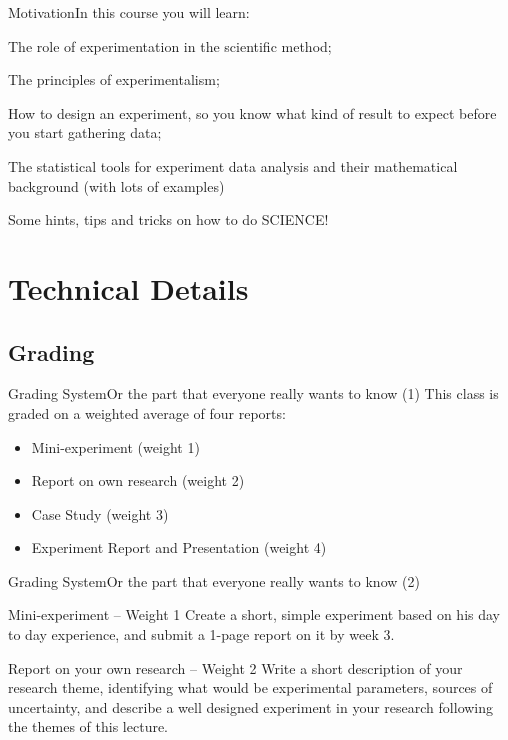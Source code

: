 \documentclass[t]{beamer}
\begin{document}
\begin{ftst}
  {Motivation}{In this course you will learn:}

\vfill
  
  \bitems The role of experimentation in the scientific method;

\vone
  
\item The principles of experimentalism;

  \vone
  
\item How to design an experiment, so you know what kind of result to
  expect before you start gathering data;

  \vone

  
\item The statistical tools for experiment data analysis and their
  mathematical background (with lots of examples)

  \vone
  
\item Some hints, tips and tricks on how to do SCIENCE!\eitem
\end{ftst}


\section{Technical Details}
\subsection{Grading}

\begin{ftst}
  {Grading System}{Or the part that everyone really wants to know (1)}
  This class is graded on a weighted average of four reports:

  \vone
  
  \begin{itemize}
  \item Mini-experiment (weight 1)
  \item Report on own research (weight 2)
  \item Case Study (weight 3)
  \item Experiment Report and Presentation (weight 4)
  \end{itemize}
\end{ftst}

\begin{ftst}
  {Grading System}{Or the part that everyone really wants to know (2)}
  \begin{block}{Mini-experiment -- Weight 1}
    Create a short, simple experiment based on his day to day
    experience, and submit a 1-page report on it by week 3.
  \end{block}
  \begin{block}{Report on your own research -- Weight 2}
    Write a short description of your research theme, identifying
    what would be experimental parameters, sources of uncertainty, and
    describe a well designed experiment in your research following the
    themes of this lecture.
  \end{block}
\end{ftst}
\end{document}
